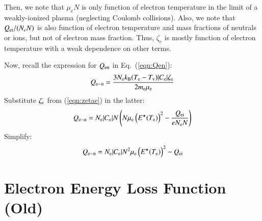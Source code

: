 \documentclass{warpdoc}
\begin{document}
Then, we note that $\mu_e N$ is only function of electron temperature in the limit of a weakly-ionized plasma (neglecting Coulomb collisions). Also, we note that $Q_{\rm ei}/(N_e N)$ is also function of electron temperature and mass fractions of neutrals or ions, but not of electron mass fraction. Thus, $\zeta_e$ is mostly function of electron temperature with a weak dependence on other terms. 

Now, recall the expression for $Q_{\rm en}$ in Eq.\ (\ref{eqn:Qen}):
%
\begin{equation}
  Q_{\rm e-n} = \frac{3 N_{\rm e} k_{\rm B} (T_{\rm e}-T_{\rm v})  |C_{\rm e}| \zeta_{\rm e}}{2 m_{\rm e}\mu_{\rm e}}
\end{equation}
%
Substitute $\zeta_{\rm e}$ from (\ref{eqn:zetae}) in the latter:
%
\begin{equation}
  Q_{\rm e-n} =  N_{\rm e}   |C_{\rm e}|  N
\left( N \mu_{\rm e}  \left(E^\star(T_{\rm e})\right)^2
 - \frac{Q_{\rm ei}}{e N_{\rm e} N}\right)
\end{equation}
%
Simplify:
%
\begin{equation}
  Q_{\rm e-n} =  N_{\rm e}   |C_{\rm e}|  N^2
  \mu_{\rm e}  \left(E^\star(T_{\rm e})\right)^2
 - Q_{\rm ei}
\end{equation}
%



\section{Electron Energy Loss Function (Old)}
\end{document}
